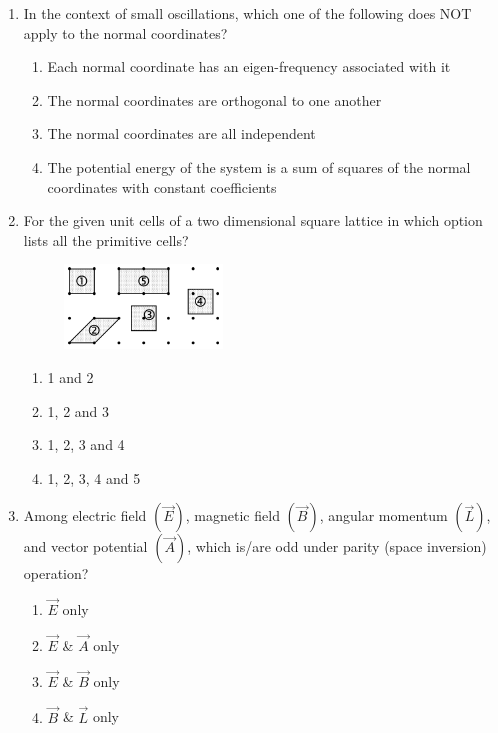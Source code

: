 \documentclass[journal,12pt,onecolumn]{IEEEtran}
\theoremstyle{remark}
\begin{document}
\begin{enumerate}
    \item In the context of small oscillations, which one of the following does NOT apply to the normal coordinates?
    \hfill{} \begin{enumerate}
        \item Each normal coordinate has an eigen-frequency associated with it
        \item The normal coordinates are orthogonal to one another
        \item The normal coordinates are all independent
        \item The potential energy of the system is a sum of squares of the normal coordinates with constant coefficients
    \end{enumerate}

    \item For the given unit cells of a two dimensional square lattice in  which option lists all the primitive cells?

    \begin{figure}[H]
        \centering
        \caption{} \label{fig:17} \includegraphics{figs/17.png}
    \end{figure} \hfill{}
\begin{enumerate}
 \item 1 and 2
 \item 1, 2 and 3
 \item 1, 2, 3 and 4
 \item 1, 2, 3, 4 and 5
\end{enumerate}

    \item Among electric field $(\vec{E})$, magnetic field $(\vec{B})$, angular momentum $(\vec{L})$, and vector potential $(\vec{A})$, which is/are odd under parity (space inversion) operation?
    \hfill{} \begin{enumerate}
        \item $\vec{E}$ only
        \item $\vec{E}$ \& $\vec{A}$ only
        \item $\vec{E}$ \& $\vec{B}$ only
        \item $\vec{B}$ \& $\vec{L}$ only
    \end{enumerate}


\end{enumerate}
\end{document}
